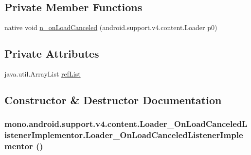 \subsection*{Private Member Functions}
\begin{CompactItemize}
\item 
native void \hyperlink{classmono_1_1android_1_1support_1_1v4_1_1content_1_1_loader___on_load_canceled_listener_implementor_e16aa8cb1a2b38c753a2b68a58bf7abb}{n\_\-onLoadCanceled} (android.support.v4.content.Loader p0)
\end{CompactItemize}
\subsection*{Private Attributes}
\begin{CompactItemize}
\item 
java.util.ArrayList \hyperlink{classmono_1_1android_1_1support_1_1v4_1_1content_1_1_loader___on_load_canceled_listener_implementor_78e19fe4a07053c89780b3ea627776f5}{refList}
\end{CompactItemize}


\subsection{Constructor \& Destructor Documentation}
\hypertarget{classmono_1_1android_1_1support_1_1v4_1_1content_1_1_loader___on_load_canceled_listener_implementor_128736c7894441300bf507febd941728}{
\subsubsection[{Loader\_\-OnLoadCanceledListenerImplementor}]{\setlength{\rightskip}{0pt plus 5cm}mono.android.support.v4.content.Loader\_\-OnLoadCanceledListenerImplementor.Loader\_\-OnLoadCanceledListenerImplementor ()}}
\label{classmono_1_1android_1_1support_1_1v4_1_1content_1_1_loader___on_load_canceled_listener_implementor_128736c7894441300bf507febd941728}




